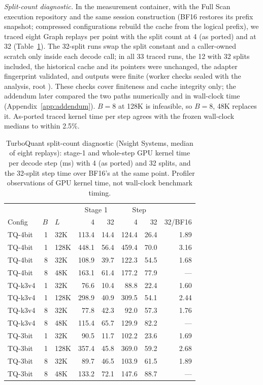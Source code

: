 \textit{Split-count diagnostic.}
In the measurement container, with the Full Scan execution repository and the same session construction (BF16 restores its prefix snapshot; compressed configurations rebuild the cache from the logical prefix), we traced eight Graph replays per point with the split count at 4 (as ported) and at 32 (Table~\ref{tab:split}).
The 32-split runs swap the split constant and a caller-owned scratch only inside each decode call; in all 33 traced runs, the 12 with 32 splits included, the historical cache and its pointers were unchanged, the adapter fingerprint validated, and outputs were finite (worker checks sealed with the analysis, root ).
These checks cover finiteness and cache integrity only; the addendum later compared the two paths numerically and in wall-clock time (Appendix~\ref{app:addendum}).
$B = 8$ at 128K is infeasible, so $B = 8$, 48K replaces it.
As-ported traced kernel time per step agrees with the frozen wall-clock medians to within 2.5\%.

\begin{table}[t]
\caption{TurboQuant split-count diagnostic (Nsight Systems, median of eight replays): stage-1 and whole-step GPU kernel time per decode step (ms) with 4 (as ported) and 32 splits, and the 32-split step time over BF16's at the same point.
Profiler observations of GPU kernel time, not wall-clock benchmark timing.}
\label{tab:split}
\vskip 0.1in
\centering
\footnotesize
\setlength{\tabcolsep}{3pt}
\begin{tabular}{@{}lrlrrrrr@{}}
\toprule
 & & & \multicolumn{2}{c}{Stage 1} & \multicolumn{2}{c}{Step} & \\
Config & $B$ & $L$ & 4 & 32 & 4 & 32 & 32/BF16 \\
\midrule
TQ-4bit & 1 & 32K & 113.4 & 14.4 & 124.4 & 26.4 & 1.89 \\
TQ-4bit & 1 & 128K & 448.1 & 56.4 & 459.4 & 70.0 & 3.16 \\
TQ-4bit & 8 & 32K & 108.9 & 39.7 & 122.3 & 54.5 & 1.68 \\
TQ-4bit & 8 & 48K & 163.1 & 61.4 & 177.2 & 77.9 & --- \\
TQ-k3v4 & 1 & 32K & 76.6 & 10.4 & 88.8 & 22.4 & 1.60 \\
TQ-k3v4 & 1 & 128K & 298.9 & 40.9 & 309.5 & 54.1 & 2.44 \\
TQ-k3v4 & 8 & 32K & 77.8 & 42.3 & 92.0 & 57.3 & 1.76 \\
TQ-k3v4 & 8 & 48K & 115.4 & 65.7 & 129.9 & 82.2 & --- \\
TQ-3bit & 1 & 32K & 90.5 & 11.7 & 102.2 & 23.6 & 1.69 \\
TQ-3bit & 1 & 128K & 357.4 & 45.8 & 369.0 & 59.2 & 2.68 \\
TQ-3bit & 8 & 32K & 89.7 & 46.5 & 103.9 & 61.5 & 1.89 \\
TQ-3bit & 8 & 48K & 133.2 & 72.1 & 147.6 & 88.7 & --- \\
\bottomrule
\end{tabular}
\end{table}

